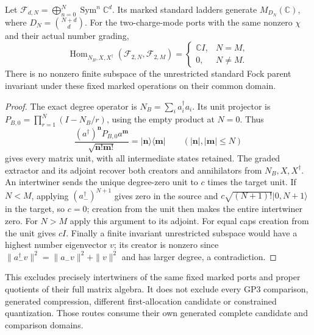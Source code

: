 \documentclass[12pt,a4paper]{article}
\begin{document}
\begin{proposition}
\label{p4:prop:v2174-fixed-port-intertwiners}
Let $\mathcal F_{d,N}=\bigoplus_{n=0}^N\operatorname{Sym}^n\mathbb C^d$.
Its marked standard ladders generate $M_{D_N}(\mathbb C)$, where
$D_N=\binom{N+d}{d}$. For the two-charge-mode ports with the same
nonzero $\chi$ and their actual number grading,
\[
 \operatorname{Hom}_{N_B,X,X^\dagger}
       (\mathcal F_{2,N},\mathcal F_{2,M})
   =\begin{cases}\mathbb CI,&N=M,\\0,&N\ne M.\end{cases}
\]
There is no nonzero finite subspace of the unrestricted standard Fock
parent invariant under these fixed marked operations on their common domain.
\end{proposition}
\begin{proof}
The exact degree operator is $N_B=\sum_i a_i^\dagger a_i$.
Its unit projector is $P_{B,0}=\prod_{r=1}^N(I-N_B/r)$, using the empty
product at $N=0$. Thus
\[
 \frac{(a^\dagger)^{\mathbf n}P_{B,0}a^{\mathbf m}}
      {\sqrt{\mathbf n!\mathbf m!}}
        =|\mathbf n\rangle\langle\mathbf m|
 \qquad(|\mathbf n|,|\mathbf m|\le N)
\]
gives every matrix unit, with all intermediate states retained.
The graded extractor and its adjoint recover both creators and annihilators
from $N_B,X,X^\dagger$. An intertwiner sends the unique degree-zero unit
to $c$ times the target unit. If $N<M$, applying $(a_-^\dagger)^{N+1}$
gives zero in the source and $c\sqrt{(N+1)!}|0,N+1\rangle$ in the target,
so $c=0$; creation from the unit then makes the entire intertwiner zero.
For $N>M$ apply this argument to its adjoint. For equal caps creation from
the unit gives $cI$. Finally a finite invariant unrestricted subspace would
have a highest number eigenvector $v$; its creator is nonzero since
$\|a_-^\dagger v\|^2=\|a_-v\|^2+\|v\|^2$ and has larger degree,
a contradiction.
\end{proof}
This excludes precisely intertwiners of the same fixed marked ports and
proper quotients of their full matrix algebra. It does not exclude every
GP3 comparison, generated compression, different first-allocation candidate
or constrained quantization. Those routes consume their own generated
complete candidate and comparison domains.
\end{document}
